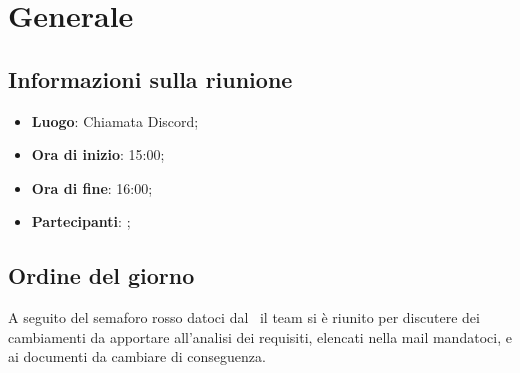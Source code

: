\section{Generale}

\vspace{10pt}


\subsection{Informazioni sulla riunione}
\begin{itemize}
	\item \textbf{Luogo}: Chiamata Discord\glo{};
	\item \textbf{Ora di inizio}: 15:00;
	\item \textbf{Ora di fine}: 16:00;
	\item \textbf{Partecipanti}: \team;
\end{itemize}

\vspace{5pt}

\subsection{Ordine del giorno}
A seguito del semaforo rosso datoci dal \commitNameS\ il team si è riunito per discutere dei cambiamenti da apportare all'analisi dei requisiti, elencati nella mail mandatoci, e ai documenti da cambiare di conseguenza.

